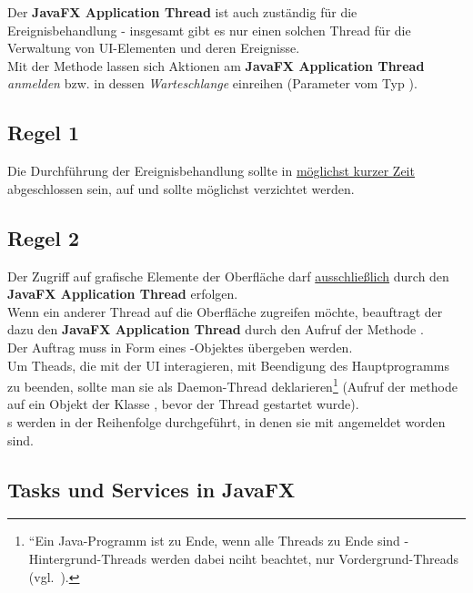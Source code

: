 \noindent
Der \textbf{JavaFX Application Thread} ist auch zuständig für die Ereignisbehandlung - insgesamt gibt es nur einen solchen Thread für die Verwaltung von UI-Elementen und deren Ereignisse. \\

\noindent
Mit der Methode  lassen sich Aktionen am \textbf{JavaFX Application Thread} \textit{anmelden} bzw. in dessen \textit{Warteschlange} einreihen (Parameter vom Typ ).\\

\subsection*{Regel 1}
Die Durchführung der Ereignisbehandlung sollte in \underline{möglichst kurzer Zeit} abgeschlossen sein, auf  und  sollte möglichst verzichtet werden.

\subsection*{Regel 2}
Der Zugriff auf grafische Elemente der Oberfläche darf \underline{ausschließlich} durch den \textbf{JavaFX Application Thread} erfolgen.\\
Wenn ein anderer Thread auf die Oberfläche zugreifen möchte, beauftragt der dazu den \textbf{JavaFX Application Thread} durch den Aufruf der Methode .\\
Der Auftrag muss in Form eines -Objektes übergeben werden.\\

\noindent
Um Theads, die mit der UI interagieren, mit Beendigung des Hauptprogramms zu beenden, sollte man sie als Daemon-Thread deklarieren\footnote{
``Ein Java-Programm ist zu Ende, wenn alle Threads zu Ende sind - Hintergrund-Threads werden dabei nciht beachtet, nur Vordergrund-Threads (vgl.~\cite[89]{Oec22}).
} (Aufruf der methode  auf ein Objekt der Klasse , bevor der Thread gestartet wurde).\\

\noindent
{}s werden in der Reihenfolge durchgeführt, in denen sie mit  angemeldet worden sind.

\subsection{Tasks und Services in JavaFX}

